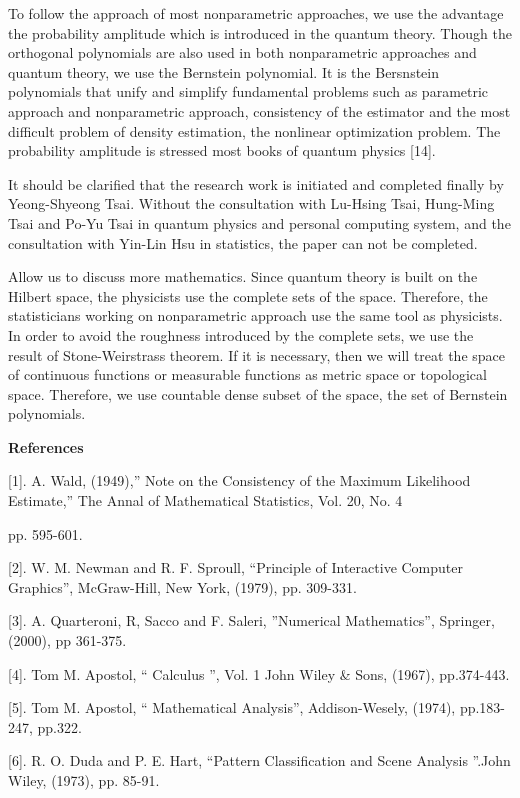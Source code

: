 \documentclass [18pt]{article}
\begin{document}
To follow the approach of most nonparametric approaches, we use the
advantage the probability amplitude which is introduced in the quantum
theory. Though the orthogonal polynomials are also used in both
nonparametric approaches and quantum theory, we use the Bernstein
polynomial. It is the Bersnstein polynomials that unify and simplify
fundamental problems such as parametric approach and nonparametric approach,
consistency of the estimator and the most difficult problem of density
estimation, the nonlinear optimization problem. The probability amplitude is
stressed most books of quantum physics [14].

It should be clarified that the research work is initiated and completed
finally by Yeong-Shyeong Tsai. Without the consultation with Lu-Hsing Tsai,
Hung-Ming Tsai and Po-Yu Tsai in quantum physics and personal computing
system, and the consultation with Yin-Lin Hsu in statistics, the paper can
not be completed.

Allow us to discuss more mathematics. Since quantum theory is built on the
Hilbert space, the physicists use the complete sets of the space. Therefore,
the statisticians working on nonparametric approach use the same tool as
physicists. In order to avoid the roughness introduced by the complete sets,
we use the result of Stone-Weirstrass theorem. If it is necessary, then we
will treat the space of continuous functions or measurable functions as
metric space or topological space. Therefore, we use countable dense subset
of the space, the set of Bernstein polynomials.





\textbf{References}

[1]. A. Wald, (1949),'' Note on the Consistency of the Maximum Likelihood
Estimate,'' The Annal of Mathematical Statistics, Vol. 20, No. 4

\noindent
pp. 595-601.

[2]. W. M. Newman and R. F. Sproull, ``Principle of Interactive Computer
Graphics'', McGraw-Hill, New York, (1979), pp. 309-331.

[3]. A. Quarteroni, R, Sacco and F. Saleri, ''Numerical Mathematics'',
Springer, (2000), pp 361-375.

[4]. Tom M. Apostol, `` Calculus '', Vol. 1 John Wiley {\&} Sons, (1967),
pp.374-443.

[5]. Tom M. Apostol, `` Mathematical Analysis'', Addison-Wesely, (1974),
pp.183-247, pp.322.

[6]. R. O. Duda and P. E. Hart, ``Pattern Classification and Scene Analysis
''.John Wiley, (1973), pp. 85-91.
\end{document}
